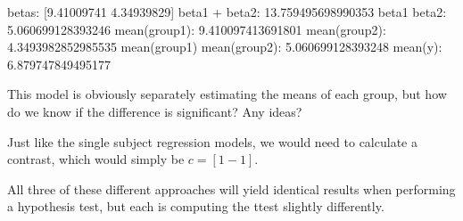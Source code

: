 \documentclass[letterpaper,10pt,english]{sphinxmanual}
\begin{document}
\begin{sphinxVerbatim}[commandchars=\\\{\}]
betas: [9.41009741 4.34939829]
beta1 + beta2: 13.759495698990353
beta1 \PYGZhy{} beta2: 5.060699128393246
mean(group1): 9.410097413691801
mean(group2): 4.3493982852985535
mean(group1) \PYGZhy{} mean(group2): 5.060699128393248
mean(y): 6.879747849495177
\end{sphinxVerbatim}

\noindent{}

This model is obviously separately estimating the means of each group, but how do we know if the difference is significant?  Any ideas?

Just like the single subject regression models, we would need to calculate a contrast, which would simply be \(c=[1 -1]\).

All three of these different approaches will yield identical results when performing a hypothesis test, but each is computing the t\sphinxhyphen{}test slightly differently.
\end{document}
